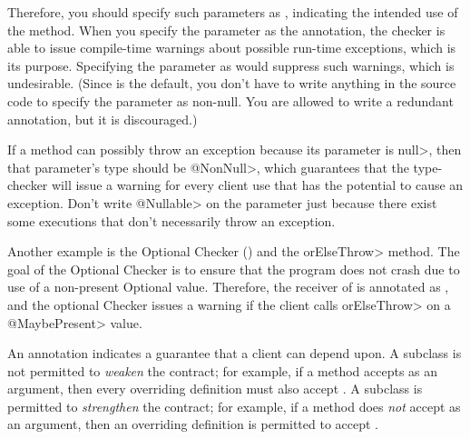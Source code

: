 Therefore, you should specify such parameters as
, indicating
the intended use of the method.  When you specify the parameter as the 
annotation, the checker is able to issue compile-time warnings about
possible run-time exceptions, which is its purpose.  Specifying the parameter
as  would suppress such warnings, which is undesirable.
(Since  is the default, you don't have to write anything in
the source code to specify the parameter as non-null.  You are allowed to
write a redundant  annotation, but it is discouraged.)

If a method can possibly throw an exception because its parameter
is \<null>, then that parameter's type should be \<@NonNull>, which
guarantees that the type-checker will issue a warning for every client
use that has the potential to cause an exception.  Don't write
\<@Nullable> on the parameter just because there exist some executions that
don't necessarily throw an exception.


Another example is the Optional Checker ()
and the \<orElseThrow> method.
The goal of the Optional Checker is to ensure that the program does not
crash due to use of a non-present Optional value.  Therefore, the receiver
of
 is annotated as
,
and the optional Checker issues a warning if the client calls
\<orElseThrow> on a \<@MaybePresent> value.



An annotation indicates a guarantee that a client can depend upon.  A subclass
is not permitted to \emph{weaken} the contract; for example,
if a method accepts  as an argument, then every overriding
definition must also accept .
A subclass is permitted to \emph{strengthen} the contract; for example,
if a method does \emph{not} accept  as an argument, then an
overriding definition is permitted to accept .

